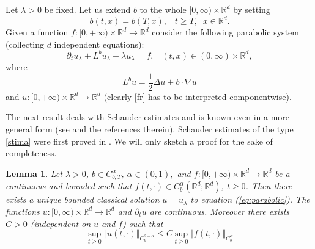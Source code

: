 \documentclass[a4paper,10pt]{article}
\newtheorem{lemma}[theorem]{Lemma}
\begin{document}
\medskip
Let $\lambda>0$ be fixed. Let us extend $b$ to the whole
$[0,\infty )\times{\mathbb{R}}^{d}$ by setting
 \begin{equation} \label{bb}
 b(t,x)=b(T,x),\;\;\;
t\geq T,\;\;  x\in{\mathbb{R}}^{d}.
 \end{equation} Given a function
$f:[0,+\infty)\times{\mathbb{R}} ^{d}\rightarrow{\mathbb{R}}^{d}$
consider the following parabolic
 system (collecting $d$ independent equations):
\begin{equation}
\partial_{t}u_{\lambda}+L^{b}u_{\lambda}-\lambda u_{\lambda}=f,\;\;\;(t,x)\in
(0,\infty)\times{\mathbb{R}}^{d} \label{eq:parabolic},
\end{equation}
where
\begin{equation} \label{fr}
L^{b}u=\frac{1}{2}\Delta u+b\cdot\nabla u
 \end{equation} and
 $u:[0,+\infty)\times{\mathbb{R}}
 ^{d}\rightarrow{\mathbb{R}}^{d}$ (clearly \eqref{fr} has to be interpreted
 componentwise).



\vskip 1mm The next  result deals with Schauder estimates and is
 known even in a more general form
 (see  \cite{KP} and the references therein). Schauder estimates
   of the type \eqref{stima} were first proved in  \cite{Br}.
  We will only sketch a proof for the
 sake of completeness.

\begin{lemma}
\label{schaud} Let $\lambda>0$, $b \in C^{\alpha}_{b,T}$, $\alpha
\in (0,1),$ and $f:[0,+\infty)\times{\mathbb{R}}
^{d}\rightarrow{\mathbb{R}}^{d}$ be a continuous and bounded such
that $f(t,\cdot)\in
C_{b}^{\alpha}({\mathbb{R}}^{d};{\mathbb{R}}^{d})$, $t\geq0$. Then
there exists a unique bounded classical solution $u = u_{\lambda}$
to equation
(\ref{eq:parabolic}). The functions $u:[0,\infty)\times{\mathbb{R}}%
^{d}\rightarrow{\mathbb{R}^d}$ and $\partial_{t}u$ are continuous.
Moreover there exists $C>0$ (independent on $u$ and $f$) such that
\begin{equation}
\sup_{t\geq0}\Vert u(t,\cdot)\Vert_{C_{b}^{2+\alpha}}\leq
C\sup_{t\geq0}\Vert f(t,\cdot)\Vert_{C_{b}^{\alpha}} \label{stima}
\end{equation}
\end{lemma}
\end{document}
